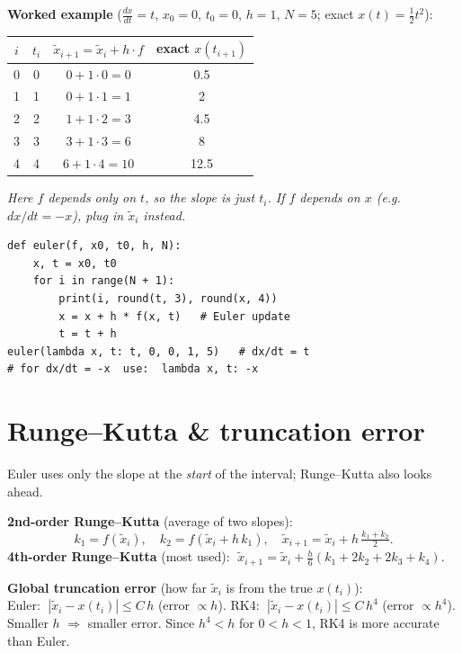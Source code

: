 \textbf{Worked example} ($\frac{dx}{dt}=t$, $x_0=0$, $t_0=0$, $h=1$, $N=5$; exact $x(t)=\tfrac12 t^2$):

\begin{center}\small
\begin{tabular}{cccc}
\toprule
$i$ & $t_i$ & $\tilde x_{i+1}=\tilde x_i+h\cdot f$ & exact $x(t_{i+1})$\\
\midrule
0 & 0 & $0+1\cdot0=0$ & 0.5\\
1 & 1 & $0+1\cdot1=1$ & 2\\
2 & 2 & $1+1\cdot2=3$ & 4.5\\
3 & 3 & $3+1\cdot3=6$ & 8\\
4 & 4 & $6+1\cdot4=10$ & 12.5\\
\bottomrule
\end{tabular}
\end{center}
\textit{Here $f$ depends only on $t$, so the slope is just $t_i$. If $f$ depends on $x$ (e.g. $dx/dt=-x$), plug in $\tilde x_i$ instead.}

\begin{lstlisting}
def euler(f, x0, t0, h, N):
    x, t = x0, t0
    for i in range(N + 1):
        print(i, round(t, 3), round(x, 4))
        x = x + h * f(x, t)   # Euler update
        t = t + h
euler(lambda x, t: t, 0, 0, 1, 5)   # dx/dt = t
# for dx/dt = -x  use:  lambda x, t: -x
\end{lstlisting}

\section{Runge--Kutta \& truncation error}
Euler uses only the slope at the \emph{start} of the interval; Runge--Kutta also looks ahead.

\textbf{2nd-order Runge--Kutta} (average of two slopes):
\[
k_1=f(\tilde x_i),\quad k_2=f(\tilde x_i+h\,k_1),\quad
\tilde x_{i+1}=\tilde x_i+h\,\tfrac{k_1+k_2}{2}.
\]
\textbf{4th-order Runge--Kutta} (most used): $\;\tilde x_{i+1}=\tilde x_i+\tfrac{h}{6}(k_1+2k_2+2k_3+k_4)$.

\begin{keybox}
\textbf{Global truncation error} (how far $\tilde x_i$ is from the true $x(t_i)$):\\
Euler: $\;|\tilde x_i-x(t_i)|\le C\,h$ \;(error $\propto h$).\qquad
RK4: $\;|\tilde x_i-x(t_i)|\le C\,h^4$ \;(error $\propto h^4$).\\
Smaller $h$ $\Rightarrow$ smaller error. Since $h^4<h$ for $0<h<1$, RK4 is more accurate than Euler.
\end{keybox}

